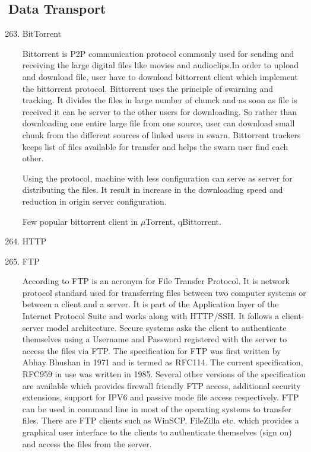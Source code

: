 \subsection{Data Transport}
\label{\detokenize{i524/technologies:data-transport}}\begin{enumerate}
\setcounter{enumi}{262}
\item {} 
BitTorrent

Bittorrent is P2P communication protocol commonly used for
sending and receiving the large digital files like movies and
audioclips.In order to upload and download file, user have to
download bittorrent client which implement the bittorrent
protocol. Bittorrent uses the principle of swarning and
tracking. \label{\detokenize{i524/technologies:id491}}{\hyperref[\detokenize{i524/technologies:www-bittorrent}]{\sphinxcrossref{{[}422{]}}}} It divides the files in large
number of chunck and as soon as file is received it can be server
to the other users for downloading.  So rather than downloading
one entire large file from one source, user can download small
chunk from the different sources of linked users in
swarn. Bittorrent trackers keeps list of files available for
transfer and helps the swarn user find each other.

Using the protocol, machine with less configuration can serve as
server for distributing the files. It result in increase in the
downloading speed and reduction in origin server configuration.

Few popular bittorrent client in \(\mu\)Torrent, qBittorrent.

\item {} 
HTTP

\item {} 
FTP

According to \label{\detokenize{i524/technologies:id492}}{\hyperref[\detokenize{i524/technologies:ftp-wiki}]{\sphinxcrossref{{[}423{]}}}} FTP is an acronym for File Transfer
Protocol. It is network protocol standard used for transferring
files between two computer systems or between a client and a
server. It is part of the Application layer of the Internet
Protocol Suite and works along with HTTP/SSH. It follows a
client-server model architecture. Secure systems asks the client
to authenticate themselves using a Username and Password
registered with the server to access the files via FTP. The
specification for FTP was first written by Abhay Bhushan
\label{\detokenize{i524/technologies:id493}}{\hyperref[\detokenize{i524/technologies:www-rfc114}]{\sphinxcrossref{{[}424{]}}}} in 1971 and is termed as RFC114. The current
specification, RFC959 in use was written in 1985. Several other
versions of the specification are available which provides
firewall friendly FTP access, additional security extensions,
support for IPV6 and passive mode file access respectively. FTP
can be used in command line in most of the operating systems to
transfer files. There are FTP clients such as WinSCP, FileZilla
etc. which provides a graphical user interface to the clients to
authenticate themselves (sign on) and access the files from the
server.


\end{enumerate}
